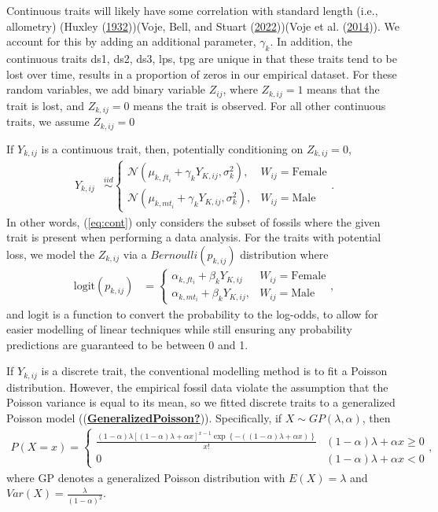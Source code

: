 \documentclass[
  12pt,
]{article}
\begin{document}
Continuous traits will likely have some correlation with standard length
(i.e., allometry) (Huxley
(\protect\hyperlink{ref-Huxley1932}{1932}))(Voje, Bell, and Stuart
(\protect\hyperlink{ref-Vojeetal2022}{2022}))(Voje et al.
(\protect\hyperlink{ref-Vojeetal2014}{2014})). We account for this by
adding an additional parameter, \(\gamma_k\). In addition, the
continuous traits ds1, ds2, ds3, lps, tpg are unique in that these
traits tend to be lost over time, results in a proportion of zeros in
our empirical dataset. For these random variables, we add binary
variable \(Z_{ij}\), where \(Z_{k,ij} = 1\) means that the trait is
lost, and \(Z_{k,ij} = 0\) means the trait is observed. For all other
continuous traits, we assume \(Z_{k,ij} = 0\)

If \(Y_{k,ij}\) is a continuous trait, then, potentially conditioning on
\(Z_{k,ij} = 0\), \begin{align}
{Y}_{k,ij} & \overset{iid}{\sim}\left\{\begin{array}{llll} \mathcal{N}(\mu_{k,ft_i} + \gamma_kY_{K,ij},\sigma_k^2), & W_{ij} = \text{Female} \\ \mathcal{N}(\mu_{k,mt_i} + \gamma_kY_{K,ij},\sigma_k^2), & W_{ij} = \text{Male} \end{array}\right..
\label{eq:cont}
\end{align} In other words, (\ref{eq:cont}) only considers the subset of
fossils where the given trait is present when performing a data
analysis. For the traits with potential loss, we model the \(Z_{k,ij}\)
via a \(Bernoulli(p_{k,ij})\) distribution where \begin{align}
\text{logit}({p}_{k,ij}) & = \left\{\begin{array}{llll} \alpha_{k,ft_i} + \beta_kY_{K,ij} & W_{ij} = \text{Female} \\ \alpha_{k,mt_i} + \beta_kY_{K,ij}, & W_{ij} = \text{Male} \end{array}\right.,
\label{eq:cont_prob}
\end{align} and logit is a function to convert the probability to the
log-odds, to allow for easier modelling of linear techniques while still
ensuring any probability predictions are guaranteed to be between 0 and
1.

If \(Y_{k,ij}\) is a discrete trait, the conventional modelling method
is to fit a Poisson distribution. However, the empirical fossil data
violate the assumption that the Poisson variance is equal to its mean,
so we fitted discrete traits to a generalized Poisson model
((\protect\hyperlink{ref-GeneralizedPoisson}{\textbf{GeneralizedPoisson?}})).
Specifically, if \(X \sim GP(\lambda,\alpha)\), then \begin{align}
P(X = x) = \left\{\begin{array}{cc} \frac{(1 - \alpha)\lambda[(1 - \alpha)\lambda + \alpha x]^{x - 1} \exp\left\{-((1 - \alpha)\lambda  + \alpha x)\right\}}{x!} & (1 - \alpha)\lambda  + \alpha x \geq 0  \\ 0 & (1 - \alpha)\lambda  + \alpha x < 0 \end{array}\right.,
\label{eq:GP_pmf}
\end{align} where GP denotes a generalized Poisson distribution with
\(E(X) = \lambda\) and \(Var(X) = \frac{\lambda}{(1 - \alpha)^2}\).
\end{document}
